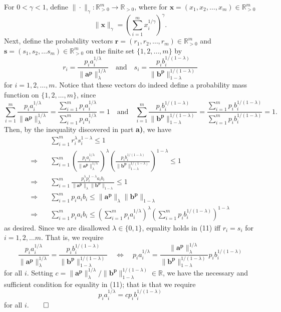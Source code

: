 \documentclass[11pt, letterpaper]{article}
\newcommand{\bs}[1]{\boldsymbol{#1}}
\newcommand{\mbb}[1]{\mathbb{#1}}
\begin{document}
For $0<\gamma<1$, define $\|\cdot\|_\gamma:\mbb{R}^m_{>0}\rightarrow\mbb{R}_{>0}$, where for $\bs{x}=(x_1,x_2,\dots,x_m)\in\mbb{R}^m_{>0}$
\[\|\bs{x}\|_\gamma=\left(\sum_{i=1}^mx_i^{1/\gamma}\right)^\gamma.\]
Next, define the probability vectors $\bs{r}=(r_1,r_2,\dots,r_m)\in\mbb{R}^m_{>0}$ and $\bs{s}=(s_1,s_2,\dots s_m)\in\mbb{R}^m_{>0}$ on the finite set $\{1,2,\dots, m\}$ by
\[r_i=\frac{p_ia_i^{1/\lambda}}{\|\bs{a^p}\|_\lambda^{1/\lambda}}\quad\text{and}\quad s_i=\frac{p_ib_i^{1/(1-\lambda)}}{\|\bs{b^p}\|_{1-\lambda}^{1/(1-\lambda)}}\]
for $i=1,2,\dots,m$. Notice that these vectors do indeed define a probability mass function on $\{1,2,\dots,m\}$, since
\[\sum_{i=1}^m\frac{p_ia_i^{1/\lambda}}{\|\bs{a^p}\|_\lambda^{1/\lambda}}=\frac{\sum_{i=1}^mp_ia_i^{1/\lambda}}{\sum_{i=1}^mp_ia_i^{1/\lambda}}=1\quad\text{and}\quad\sum_{i=1}^m\frac{p_ib_i^{1/(1-\lambda)}}{\|\bs{b^p}\|_{1-\lambda}^{1/(1-\lambda)}}=\frac{\sum_{i=1}^mp_ib_i^{1/(1-\lambda)}}{\sum_{i=1}^mp_ib_i^{1/(1-\lambda)}}=1.\]
Then, by the inequality discovered in part {\bf a)}, we have
\begin{align*}
    &\sum_{i=1}^mr_i^\lambda s_i^{1-\lambda}\leq 1\\
    \Rightarrow\quad&\sum_{i=1}^m\left(\frac{p_ia_i^{1/\lambda}}{\|\bs{a^p}\|_\lambda^{1/\lambda}}\right)^\lambda\left(\frac{p_ib_i^{1/(1-\lambda)}}{\|\bs{b^p}\|_{1-\lambda}^{1/(1-\lambda)}}\right)^{1-\lambda}\leq 1\\
    \Rightarrow\quad&\sum_{i=1}^m\frac{p_i^\lambda p_i^{1-\lambda}a_ib_i}{\|\bs{a^p}\|_\lambda\|\bs{b^p}\|_{1-\lambda}}\leq 1\\
    \Rightarrow\quad&\sum_{i=1}^mp_ia_ib_i\leq\|\bs{a^p}\|_\lambda\|\bs{b^p}\|_{1-\lambda}\\
    \Rightarrow\quad&\sum_{i=1}^mp_ia_ib_i\leq\left(\sum_{i=1}^mp_ia_i^{1/\lambda}\right)^{\lambda}\left(\sum_{i=1}^mp_ib_i^{1/(1-\lambda)}\right)^{1-\lambda}\tag{11}
\end{align*}
as desired. Since we are disallowed $\lambda\in\{0,1\}$, equality holds in (11) iff $r_i=s_i$ for $i=1,2,\dots m$. That is, we require
\[\frac{p_ia_i^{1/\lambda}}{\|\bs{a^p}\|_\lambda^{1/\lambda}}=\frac{p_ib_i^{1/(1-\lambda)}}{\|\bs{b^p}\|_{1-\lambda}^{1/(1-\lambda)}}\quad\Leftrightarrow\quad p_ia_i^{1/\lambda}=\frac{\|\bs{a^p}\|_\lambda^{1/\lambda}}{\|\bs{b^p}\|_{1-\lambda}^{1/(1-\lambda)}}p_ib_i^{1/(1-\lambda)}\]
for all $i$. Setting $c=\|\bs{a^p}\|_{\lambda}^{1/\lambda}/\|\bs{b^p}\|_{1-\lambda}^{1/(1-\lambda)}\in\mbb{R}$, we have the necessary and sufficient condition for equality in (11); that is that we require
\[p_ia_i^{1/\lambda}=cp_ib_i^{1/(1-\lambda)}\]
for all $i$.\hfill{$\qed$}\\[10pt]
\end{document}
